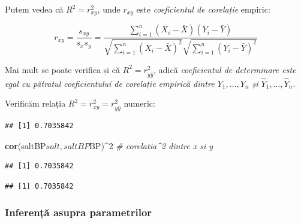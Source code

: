\documentclass[]{article}
\newenvironment{Shaded}{\begin{snugshade}}{\end{snugshade}}
\newcommand{\KeywordTok}[1]{\textcolor[rgb]{0.13,0.29,0.53}{\textbf{{#1}}}}
\newcommand{\DecValTok}[1]{\textcolor[rgb]{0.00,0.00,0.81}{{#1}}}
\newcommand{\StringTok}[1]{\textcolor[rgb]{0.31,0.60,0.02}{{#1}}}
\newcommand{\CommentTok}[1]{\textcolor[rgb]{0.56,0.35,0.01}{\textit{{#1}}}}
\newcommand{\NormalTok}[1]{{#1}}
\begin{document}
Putem vedea că \(R^2=r_{xy}^2\), unde \(r_{xy}\) este \emph{coeficientul
de corelație} empiric:

\[
r_{xy}=\frac{s_{xy}}{s_xs_y}=\frac{\sum_{i=1}^n \left(X_i-\bar X \right)\left(Y_i-\bar Y \right)}{\sqrt{\sum_{i=1}^n \left(X_i-\bar X \right)^2}\sqrt{\sum_{i=1}^n \left(Y_i-\bar Y \right)^2}}
\]

Mai mult se poate verifica și că \(R^2=r^2_{y\hat y}\), adică
\emph{coeficientul de determinare este egal cu pătratul coeficientului
de corelație empirică dintre \(Y_1,\ldots,Y_n\) și
\(\hat Y_1,\ldots,\hat Y_n\)}.

Verificăm relația \(R^2=r^2_{xy}=r^2_{y\hat y}\) numeric:

\begin{Shaded}
\end{Shaded}

\begin{verbatim}
## [1] 0.7035842
\end{verbatim}

\begin{Shaded}
\begin{Highlighting}[]
\KeywordTok{cor}\NormalTok{(saltBP$salt, saltBP$BP)^}\DecValTok{2} \CommentTok{# corelatia^2 dintre x si y}
\end{Highlighting}
\end{Shaded}

\begin{verbatim}
## [1] 0.7035842
\end{verbatim}

\begin{Shaded}
\end{Shaded}

\begin{verbatim}
## [1] 0.7035842
\end{verbatim}

\subsubsection{Inferență asupra
parametrilor}\label{inferenta-asupra-parametrilor}
\end{document}
